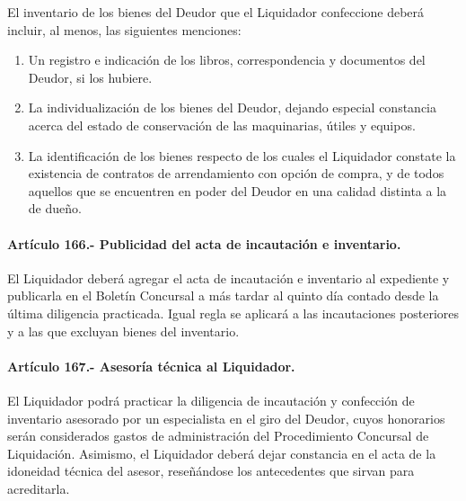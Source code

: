 \documentclass[
]{book}
\begin{document}
El inventario de los bienes del Deudor que el Liquidador confeccione deberá incluir, al menos, las siguientes menciones:

\begin{enumerate}
\def\labelenumi{\arabic{enumi})}
\item
  Un registro e indicación de los libros, correspondencia y documentos del Deudor, si los hubiere.
\item
  La individualización de los bienes del Deudor, dejando especial constancia acerca del estado de conservación de las maquinarias, útiles y equipos.
\item
  La identificación de los bienes respecto de los cuales el Liquidador constate la existencia de contratos de arrendamiento con opción de compra, y de todos aquellos que se encuentren en poder del Deudor en una calidad distinta a la de dueño.
\end{enumerate}

\hypertarget{artuxedculo-166.--publicidad-del-acta-de-incautaciuxf3n-e-inventario.}{%
\paragraph*{Artículo 166.- Publicidad del acta de incautación e inventario.}\label{artuxedculo-166.--publicidad-del-acta-de-incautaciuxf3n-e-inventario.}}

El Liquidador deberá agregar el acta de incautación e inventario al expediente y publicarla en el Boletín Concursal a más tardar al quinto día contado desde la última diligencia practicada. Igual regla se aplicará a las incautaciones posteriores y a las que excluyan bienes del inventario.

\hypertarget{artuxedculo-167.--asesoruxeda-tuxe9cnica-al-liquidador.}{%
\paragraph*{Artículo 167.- Asesoría técnica al Liquidador.}\label{artuxedculo-167.--asesoruxeda-tuxe9cnica-al-liquidador.}}

El Liquidador podrá practicar la diligencia de incautación y confección de inventario asesorado por un especialista en el giro del Deudor, cuyos honorarios serán considerados gastos de administración del Procedimiento Concursal de Liquidación. Asimismo, el Liquidador deberá dejar constancia en el acta de la idoneidad técnica del asesor, reseñándose los antecedentes que sirvan para acreditarla.
\end{document}
